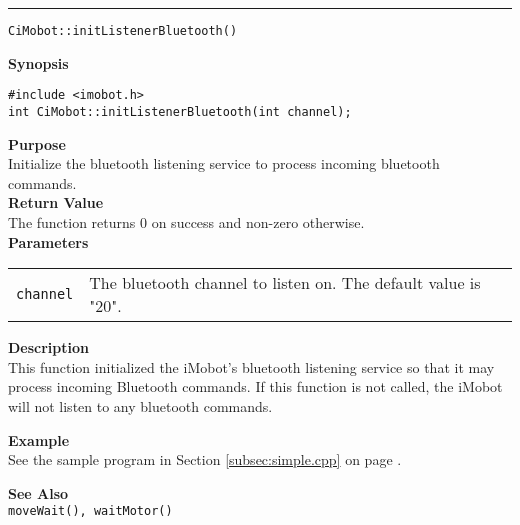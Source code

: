 \noindent
\vspace{5pt}
\rule{6.5in}{0.015in}
\noindent
{\LARGE \texttt{CiMobot::initListenerBluetooth()}}\\
{}

\noindent
{\bf Synopsis}\\
\begin{verbatim}
#include <imobot.h>
int CiMobot::initListenerBluetooth(int channel);
\end{verbatim}

\noindent
{\bf Purpose}\\
Initialize the bluetooth listening service to process incoming bluetooth commands.\\

\noindent
{\bf Return Value}\\
The function returns 0 on success and non-zero otherwise.\\

\noindent
{\bf Parameters}
\vspace{-0.1in}
\begin{description}
\item               
\begin{tabular}{p{20 mm}p{145 mm}}
\texttt{channel} & The bluetooth channel to listen on. The default value is "20". \\
\end{tabular}
\end{description}

\noindent
{\bf Description}\\
This function initialized the iMobot's bluetooth listening service so that it may process incoming Bluetooth commands. If this function is not called, the iMobot will not listen to any bluetooth commands.

\noindent
{\bf Example}\\
See the sample program in Section \ref{subsec:simple.cpp} on page \pageref{subsec:simple.cpp}.
\noindent

\noindent
{\bf See Also}\\
\texttt{moveWait(), waitMotor()}

